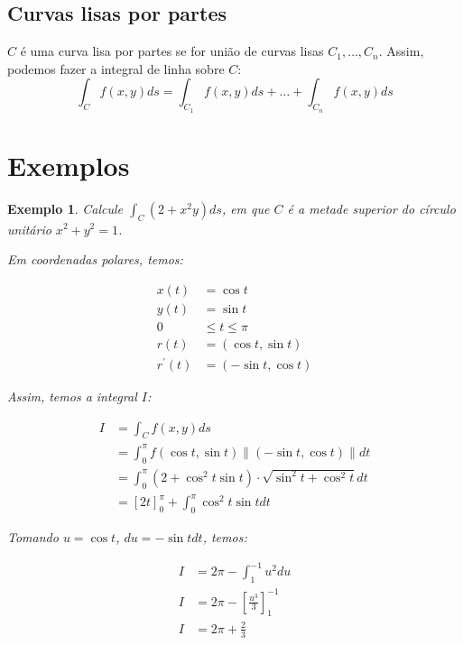 \documentclass{article}
\newcommand{\norm}[1] {\left.\parallel #1 \right.\parallel}
\newtheorem{example}{Exemplo}[section]
\begin{document}
        \subsection{Curvas lisas por partes}
            $C$ é uma curva lisa por partes se for união de curvas lisas $C_1, \dots, C_n$. Assim,
            podemos fazer a integral de linha sobre $C$:
            \[
                \int_C f(x,y) ds = \int_{C_1} f(x,y) ds + \dots + \int_{C_n} f(x,y) ds
            \]

    \section{Exemplos}
        \begin{example}
            Calcule $\int_C (2 + x^2 y) ds$, em que $C$ é a metade superior do círculo unitário $x^2 + y^2 = 1$.

            Em coordenadas polares, temos:

            \begin{align*}
                x(t) &= \cos t\\
                y(t) &= \sin t\\
                0 &\leq t \leq \pi\\
                r(t) &= (\cos t, \sin t)\\
                r^\prime(t) &= (-\sin t, \cos t)
            \end{align*}

            Assim, temos a integral $I$:

            \begin{align*}
                I &= \int_C f(x,y) ds\\
                &= \int_0^\pi f(\cos t, \sin t) \norm{(-\sin t, \cos t)} dt\\
                &= \int_0^\pi (2 + \cos^2 t \sin t) \cdot \sqrt{\sin^2 t + \cos^2 t} dt\\
                &= [2t]_0^\pi + \int_0^\pi \cos^2 t \sin t dt
            \end{align*}

            Tomando $u = \cos t$, $du = -\sin t dt$, temos:

            \begin{align*}
                I &= 2\pi - \int_1^{-1} u^2 du\\
                I &= 2\pi - \left[ \frac{u^3}{3} \right]_1^{-1}\\
                I &= 2\pi + \frac{2}{3}
            \end{align*}
        \end{example}
\end{document}
